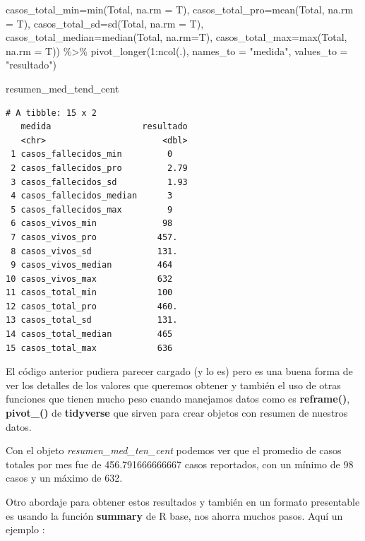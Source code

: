 \documentclass[
  letterpaper,
  DIV=11,
  numbers=noendperiod]{scrreprt}
\newenvironment{Shaded}{\begin{snugshade}}{\end{snugshade}}
\newcommand{\AttributeTok}[1]{\textcolor[rgb]{0.40,0.45,0.13}{#1}}
\newcommand{\DecValTok}[1]{\textcolor[rgb]{0.68,0.00,0.00}{#1}}
\newcommand{\FunctionTok}[1]{\textcolor[rgb]{0.28,0.35,0.67}{#1}}
\newcommand{\NormalTok}[1]{\textcolor[rgb]{0.00,0.23,0.31}{#1}}
\newcommand{\SpecialCharTok}[1]{\textcolor[rgb]{0.37,0.37,0.37}{#1}}
\newcommand{\StringTok}[1]{\textcolor[rgb]{0.13,0.47,0.30}{#1}}
\begin{document}
\begin{Shaded}
\begin{Highlighting}[]
          \AttributeTok{casos\_total\_min=}\FunctionTok{min}\NormalTok{(Total, }\AttributeTok{na.rm =}\NormalTok{ T),}
          \AttributeTok{casos\_total\_pro=}\FunctionTok{mean}\NormalTok{(Total, }\AttributeTok{na.rm =}\NormalTok{ T),}
          \AttributeTok{casos\_total\_sd=}\FunctionTok{sd}\NormalTok{(Total, }\AttributeTok{na.rm =}\NormalTok{ T),}
          \AttributeTok{casos\_total\_median=}\FunctionTok{median}\NormalTok{(Total, }\AttributeTok{na.rm=}\NormalTok{T),}
          \AttributeTok{casos\_total\_max=}\FunctionTok{max}\NormalTok{(Total, }\AttributeTok{na.rm =}\NormalTok{ T)) }\SpecialCharTok{\%\textgreater{}\%} 
  \FunctionTok{pivot\_longer}\NormalTok{(}\DecValTok{1}\SpecialCharTok{:}\FunctionTok{ncol}\NormalTok{(.), }\AttributeTok{names\_to =} \StringTok{"medida"}\NormalTok{, }\AttributeTok{values\_to =} \StringTok{"resultado"}\NormalTok{)}


  
\NormalTok{resumen\_med\_tend\_cent}
\end{Highlighting}
\end{Shaded}

\begin{verbatim}
# A tibble: 15 x 2
   medida                  resultado
   <chr>                       <dbl>
 1 casos_fallecidos_min         0   
 2 casos_fallecidos_pro         2.79
 3 casos_fallecidos_sd          1.93
 4 casos_fallecidos_median      3   
 5 casos_fallecidos_max         9   
 6 casos_vivos_min             98   
 7 casos_vivos_pro            457.  
 8 casos_vivos_sd             131.  
 9 casos_vivos_median         464   
10 casos_vivos_max            632   
11 casos_total_min            100   
12 casos_total_pro            460.  
13 casos_total_sd             131.  
14 casos_total_median         465   
15 casos_total_max            636   
\end{verbatim}

El código anterior pudiera parecer cargado (y lo es) pero es una buena
forma de ver los detalles de los valores que queremos obtener y también
el uso de otras funciones que tienen mucho peso cuando manejamos datos
como es \textbf{reframe()}, \textbf{pivot\_()} de \textbf{tidyverse} que
sirven para crear objetos con resumen de nuestros datos.

Con el objeto \emph{resumen\_med\_ten\_cent} podemos ver que el promedio
de casos totales por mes fue de 456.791666666667 casos reportados, con
un mínimo de 98 casos y un máximo de 632.

Otro abordaje para obtener estos resultados y también en un formato
presentable es usando la función \textbf{summary} de R base, nos ahorra
muchos pasos. Aquí un ejemplo :
\end{document}
